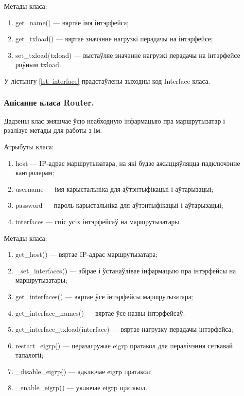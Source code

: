 Метады класа:
\begin{enumerate}
    \item get\_name() --- вяртае імя інтэрфейса;
    \item get\_txload() --- вяртае значэнне нагрузкі перадачы на інтэрфейсе;
    \item set\_txload(txload) --- выстаўляе значэнне нагрузкі перадачы на інтэрфейсе
    роўным txload.
\end{enumerate}

У лістынгу \ref{lst: interface} прадстаўлены зыходны код Interface класа.



\vspace{-\baselineskip}

\subsubsection{Апісанне класа Router.}

Дадзены клас змяшчае ўсю неабходную інфармацыю пра маршрутызатар і рэалізуе
метады для работы з ім.

Атрыбуты класа:
\begin{enumerate}
    \item host --- IP-адрас маршрутызатара, на які будзе ажыццяўляцца падключэнне кантролерам;
    \item username --- імя карыстальніка для аўтэнтыфікацыі і аўтарызацыі;
    \item password --- пароль карыстальніка для аўтэнтыфікацыі і аўтарызацыі;
    \item interfaces --- спіс усіх інтэрфейсаў на маршрутызатары.
\end{enumerate}

Метады класа:
\begin{enumerate}
    \item get\_host() --- вяртае IP-адрас маршрутызатара;
    \item \_set\_interfaces() --- збірае і ўстанаўлівае інфармацыю пра інтэрфейсы на маршрутызатары;
    \item get\_interfaces() --- вяртае ўсе інтэрфейсы маршрутызатара;
    \item get\_interface\_names() --- вяртае ўсе назвы інтэрфейсаў;
    \item get\_interface\_txload(interface) --- вяртае нагрузку перадачы інтэрфейса;
    \item restart\_eigrp() --- перазагружае eigrp пратакол для пералічэння сеткавай тапалогіі;
    \item \_disable\_eigrp() --- адключае eigrp пратакол;
    \item \_enable\_eigrp() --- уключае eigrp пратакол.
\end{enumerate}

